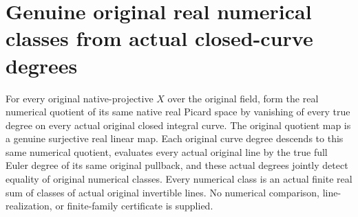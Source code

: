 \section{Genuine original real numerical classes from actual closed-curve degrees}
\label{sec:native-real-numerical-classes}

\begin{theorem}
\label{thm:native-real-numerical-classes}
\leanok
{}
For every original native-projective $X$ over the original field,
form the real numerical quotient of its same native real Picard
space by vanishing of every true degree on every actual original
closed integral curve. The original quotient map is a genuine
surjective real linear map. Each original curve degree descends
to this same numerical quotient, evaluates every actual original
line by the true full Euler degree of its same original pullback,
and these actual degrees jointly detect equality of original
numerical classes. Every numerical class is an actual finite
real sum of classes of actual original invertible lines. No
numerical comparison, line-realization, or finite-family
certificate is supplied.
\end{theorem}

